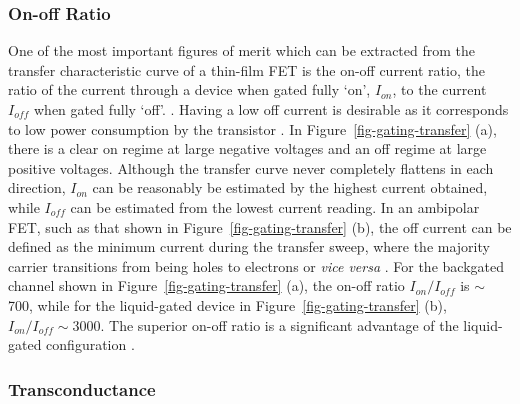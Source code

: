 \documentclass[
  a4paper,
]{scrbook}
\begin{document}
\hypertarget{on-off-ratio}{%
\subsubsection*{On-off Ratio}\label{on-off-ratio}}

One of the most important figures of merit which can be extracted from
the transfer characteristic curve of a thin-film FET is the on-off
current ratio, the ratio of the current through a device when gated
fully `on', \(I_{on}\), to the current \(I_{off}\) when gated fully
`off'. \autocite{Petti2016,Shkodra2021}. Having a low off current is
desirable as it corresponds to low power consumption by the transistor
\autocite{Rouhi2010}. In Figure~\ref{fig-gating-transfer} (a), there is
a clear on regime at large negative voltages and an off regime at large
positive voltages. Although the transfer curve never completely flattens
in each direction, \(I_{on}\) can be reasonably be estimated by the
highest current obtained, while \(I_{off}\) can be estimated from the
lowest current reading. In an ambipolar FET, such as that shown in
Figure~\ref{fig-gating-transfer} (b), the off current can be defined as
the minimum current during the transfer sweep, where the majority
carrier transitions from being holes to electrons or \emph{vice versa}
\autocite{Petti2016,Zheng2017}. For the backgated channel shown in
Figure~\ref{fig-gating-transfer} (a), the on-off ratio
\(I_{on}/I_{off}\) is \(\sim\) 700, while for the liquid-gated device in
Figure~\ref{fig-gating-transfer} (b), \(I_{on}/I_{off} \sim 3000\). The
superior on-off ratio is a significant advantage of the liquid-gated
configuration \autocite{Shkodra2021}.

\hypertarget{transconductance}{%
\subsubsection*{Transconductance}\label{transconductance}}
\end{document}
